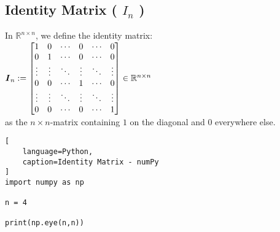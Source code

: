 \subsection{Identity Matrix ( $I_n$ )}

In $\mathbb{R}^{n\times n}$, we define the identity matrix:\\
\vspace{0.5cm}
\hfill
$
    \text{\textbf{\textit{I}}}_n
    := \begin{bmatrix}
        1 & 0 & \cdots & 0 & \cdots & 0 \\
        0 & 1 & \cdots & 0 & \cdots & 0 \\
        \vdots & \vdots & \ddots & \vdots & \ddots & \vdots \\
        0 & 0 & \cdots & 1 & \cdots & 0 \\
        \vdots & \vdots & \ddots & \vdots & \ddots & \vdots \\
        0 & 0 & \cdots & 0 & \cdots & 1 \\
    \end{bmatrix}
    \in \mathbb{R}^{n\times n}
$
\hfill \cite{mfml/book/mml/Deisenroth-Faisal-Ong}
\\
as the $n \times n$-matrix containing $1$ on the diagonal and $0$ everywhere else.







\begin{lstlisting}[
    language=Python,
    caption=Identity Matrix - numPy
]
import numpy as np

n = 4

print(np.eye(n,n))
\end{lstlisting}








